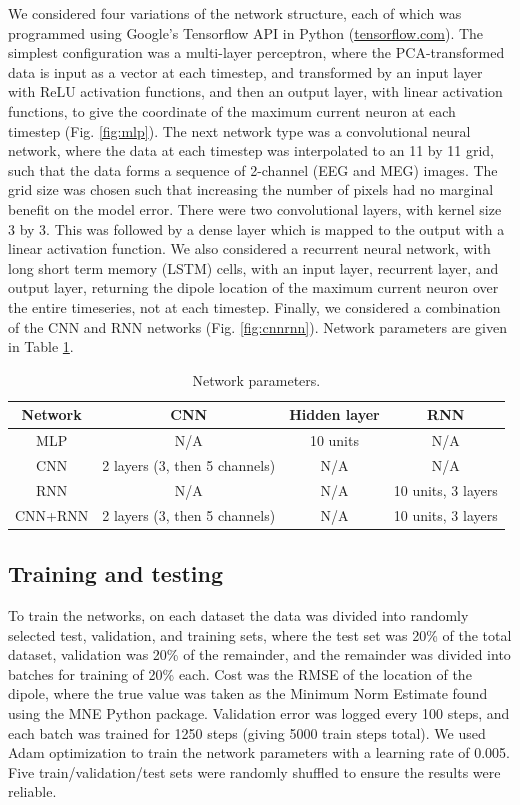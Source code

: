 \documentclass[journal,12pt,onecolumn,draftclsnofoot]{IEEEtran}
\begin{document}
We considered four variations of the network structure, each of which was programmed using Google's Tensorflow API in Python (\url{tensorflow.com}). The simplest configuration was a multi-layer perceptron, where the PCA-transformed data is input as a vector at each timestep, and transformed by an input layer with ReLU activation functions, and then an output layer, with linear activation functions, to give the coordinate of the maximum current neuron at each timestep (Fig. \ref{fig:mlp}). The next network type was a convolutional neural network, where the data at each timestep was interpolated to an 11 by 11 grid, such that the data forms a sequence of 2-channel (EEG and MEG) images. The grid size was chosen such that increasing the number of pixels had no marginal benefit on the model error. There were two convolutional layers, with kernel size 3 by 3. This was followed by a dense layer which is mapped to the output with a linear activation function. We also considered a recurrent neural network, with long short term memory (LSTM) cells, with an input layer, recurrent layer, and output layer, returning the dipole location of the maximum current neuron over the entire timeseries, not at each timestep. Finally, we considered a combination of the CNN and RNN networks (Fig. \ref{fig:cnnrnn}). Network parameters are given in Table \ref{tab:params}. 

\begin{table}[h!]
  \centering
  \begin{tabular}{c||c|c|c}
    \hline
    Network & CNN & Hidden layer & RNN\\
    \hline
    \hline
    MLP & N/A & 10 units & N/A \\
    \hline
    CNN & 2 layers (3, then 5 channels) & N/A & N/A \\
    \hline
    RNN & N/A & N/A & 10 units, 3 layers \\
    \hline
    CNN+RNN & 2 layers (3, then 5 channels) &  N/A & 10 units, 3 layers \\
  \end{tabular}
  \caption{Network parameters.}
  \label{tab:params}
\end{table}


\subsection{Training and testing}

To train the networks, on each dataset the data was divided into randomly selected test, validation, and training sets, where the test set was 20\% of the total dataset, validation was 20\% of the remainder, and the remainder was divided into batches for training of 20\% each. Cost was the RMSE of the location of the dipole, where the true value was taken as the Minimum Norm Estimate found using the MNE Python package. Validation error was logged every 100 steps, and each batch was trained for 1250 steps (giving 5000 train steps total). We used Adam optimization to train the network parameters \cite{kingma2014adam} with a learning rate of 0.005. Five train/validation/test sets were randomly shuffled to ensure the results were reliable.
\end{document}
